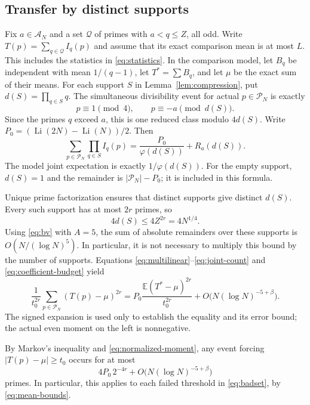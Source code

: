 \documentclass[11pt]{article}
\theoremstyle{remark}\newtheorem{remark}[theorem]{Remark}
\newcommand{\Li}{\operatorname{Li}}
\newcommand{\E}{\mathbb E}
\newcommand{\cP}{\mathcal P}
\newcommand{\cA}{\mathcal A}
\begin{document}
\subsection{Transfer by distinct supports}
Fix $a\in\cA_N$ and a set $\mathcal Q$ of primes with
$a<q\le Z$, all odd. Write $T(p)=\sum_{q\in\mathcal Q}I_q(p)$
and assume that its exact comparison mean is at most $L$.
This includes the statistics in \eqref{eq:statistics}.
In the comparison model,
let $B_q$ be independent with mean $1/(q-1)$, let $T^*=\sum B_q$,
and let $\mu$ be the exact sum of their means. For each support $S$
in Lemma~\ref{lem:compression}, put $d(S)=\prod_{q\in S}q$.
The simultaneous divisibility event for actual $p\in\cP_N$ is exactly
\[
 p\equiv1\pmod4,\qquad p\equiv-a\pmod{d(S)}.
\]
Since the primes $q$ exceed $a$, this is one reduced class modulo
$4d(S)$. Write $P_0=(\Li(2N)-\Li(N))/2$. Then
\begin{equation}\label{eq:joint-count}
 \sum_{p\in\cP_N}\prod_{q\in S}I_q(p)
       =\frac{P_0}{\varphi(d(S))}+R_a(d(S)).
\end{equation}
The model joint expectation is exactly $1/\varphi(d(S))$.
For the empty support, $d(S)=1$ and the remainder is
$|\cP_N|-P_0$; it is included in this formula.

Unique prime factorization ensures that distinct supports give distinct
$d(S)$. Every such support has at most $2r$ primes, so
\begin{equation}\label{eq:modulus-budget}
 4d(S)\le4Z^{2r}=4N^{1/4}.
\end{equation}
Using \eqref{eq:bv} with $A=5$, the sum of absolute remainders over
these supports is $O(N/(\log N)^5)$. In particular, it is not necessary
to multiply this bound by the number of supports.
Equations \eqref{eq:multilinear}--\eqref{eq:joint-count} and
\eqref{eq:coefficient-budget} yield
\begin{equation}\label{eq:transfer}
 \frac1{t_0^{2r}}\sum_{p\in\cP_N}(T(p)-\mu)^{2r}
 =P_0\frac{\E(T^*-\mu)^{2r}}{t_0^{2r}}
       +O\bigl(N(\log N)^{-5+\beta}\bigr).
\end{equation}
The signed expansion is used only to establish the equality and its
error bound; the actual even moment on the left is nonnegative.

By Markov's inequality and \eqref{eq:normalized-moment},
any event forcing $|T(p)-\mu|\ge t_0$ occurs for at most
\begin{equation}\label{eq:one-bad}
 4P_0\,2^{-4r}+O\bigl(N(\log N)^{-5+\beta}\bigr)
\end{equation}
primes. In particular, this applies to each failed threshold in
\eqref{eq:badset}, by \eqref{eq:mean-bounds}.
\end{document}
